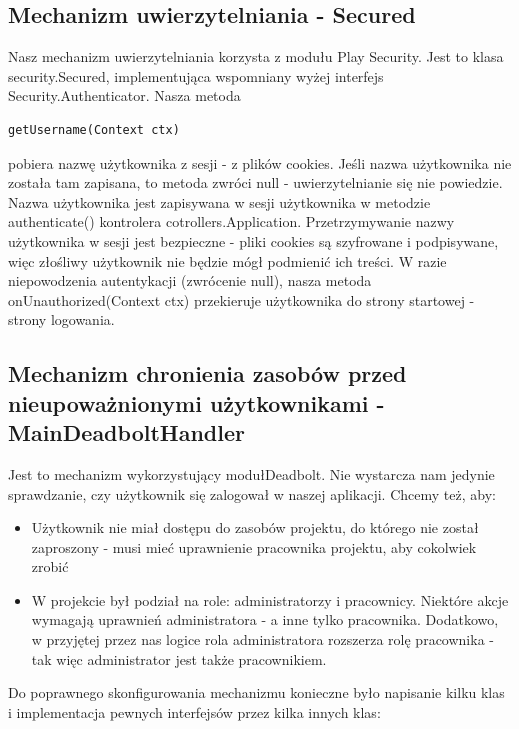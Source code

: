 \documentclass[a4paper,12pt,notitlepage]{mwrep}
\begin{document}
\subsection{Mechanizm uwierzytelniania - Secured}

Nasz mechanizm uwierzytelniania korzysta z modułu Play Security. Jest to klasa security.Secured, implementująca wspomniany wyżej interfejs Security.Authenticator. Nasza metoda \begin{verbatim}getUsername(Context ctx)\end{verbatim} pobiera nazwę użytkownika z sesji - z plików cookies. Jeśli nazwa użytkownika nie została tam zapisana, to metoda zwróci null - uwierzytelnianie się nie powiedzie. Nazwa użytkownika jest zapisywana w sesji użytkownika w metodzie authenticate() kontrolera cotrollers.Application. Przetrzymywanie nazwy użytkownika w sesji jest bezpieczne - pliki cookies są szyfrowane i podpisywane, więc złośliwy użytkownik nie będzie mógł podmienić ich treści. W razie niepowodzenia autentykacji (zwrócenie null), nasza metoda onUnauthorized(Context ctx) przekieruje użytkownika do strony startowej - strony logowania.

\subsection{Mechanizm chronienia zasobów przed nieupoważnionymi użytkownikami - MainDeadboltHandler}

Jest to mechanizm wykorzystujący modułDeadbolt. Nie wystarcza nam jedynie sprawdzanie, czy użytkownik się zalogował w naszej aplikacji. Chcemy też, aby:
\begin{itemize}
	\item	Użytkownik nie miał dostępu do zasobów projektu, do którego nie został zaproszony - musi mieć uprawnienie pracownika projektu, aby cokolwiek zrobić
	\item	W projekcie był podział na role: administratorzy i pracownicy. Niektóre akcje wymagają uprawnień administratora - a inne tylko pracownika. Dodatkowo, w przyjętej przez nas logice rola administratora rozszerza rolę pracownika - tak więc administrator jest także pracownikiem.
\end{itemize}
Do poprawnego skonfigurowania mechanizmu konieczne było napisanie kilku klas i implementacja pewnych interfejsów przez kilka innych klas:
\end{document}
